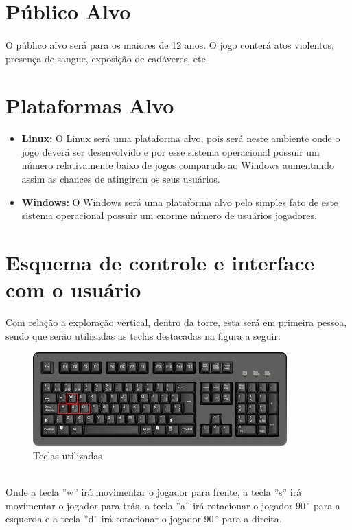 \documentclass[11pt]{article} %
\begin{document}
\section*{Público Alvo}

\paragraph{}O público alvo será para os maiores de 12 anos. O jogo conterá atos violentos, presença de sangue, exposição de cadáveres, etc.

\section*{Plataformas Alvo}
\begin{itemize}
\item \textbf{Linux:} O Linux será uma plataforma alvo, pois será neste ambiente onde o jogo deverá ser desenvolvido e por esse sistema operacional possuir um número relativamente baixo de jogos comparado ao Windows aumentando assim as chances de atingirem os seus usuários. 

\item \textbf{Windows:} O Windows será uma plataforma alvo pelo simples fato de este sistema operacional possuir um enorme número de usuários jogadores.
\end{itemize}

\section*{Esquema de controle e interface com o usuário}
Com relação a exploração vertical, dentro da torre, esta será em primeira pessoa, sendo que serão utilizadas as teclas destacadas na figura a seguir:\\
\begin{figure}[!htp]
\centering
\includegraphics[scale=0.75]{res/keyboard.jpg}
\caption{Teclas utilizadas}
\label{Teclado}
\end{figure}
\\Onde a tecla ''w'' irá movimentar o jogador para frente, a tecla ''s'' irá movimentar o jogador para trás, a tecla ''a'' irá rotacionar o jogador $90\,^{\circ}$ para a esquerda e a tecla ''d'' irá rotacionar o jogador $90\,^{\circ}$ para a direita.
\end{document}
